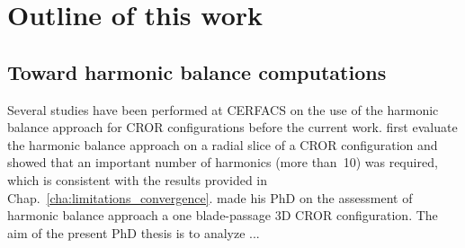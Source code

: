   









\section*{Outline of this work}
\label{sec:outline_of_this_work}

\subsection*{Toward harmonic balance computations}
\label{sub:toward_harmonic_balance_computations}

Several studies have been performed at CERFACS on the use
of the harmonic balance approach for CROR configurations 
before the current work.
\citet{Yabili2010} first evaluate the harmonic balance approach
on a radial slice of a CROR configuration and showed that an
important number of harmonics (more than~10) was required,
which is consistent with the results provided in 
Chap.~\ref{cha:limitations_convergence}.
\citet{ThesisFrancois} made his PhD on the assessment of
harmonic balance approach a one blade-passage 3D CROR configuration.
The aim of the present PhD thesis is to analyze ...



